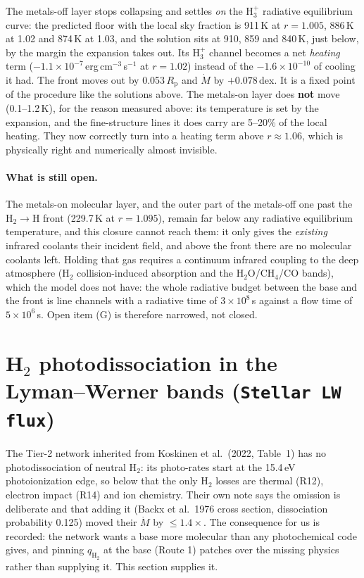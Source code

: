 \documentclass[english,a4paper]{my_memo}
\newcommand{\Rp}{R_{\mathrm{p}}}
\newcommand{\Mdot}{\dot{M}}
\newcommand{\qHH}{q_{\mathrm{H_2}}}
\begin{document}
\noindent The metals-off layer stops collapsing and settles \emph{on} the
H$_3^+$ radiative equilibrium curve: the predicted floor with the local sky
fraction is 911\,K at $r=1.005$, 886\,K at 1.02 and 874\,K at 1.03, and the
solution sits at 910, 859 and 840\,K, just below, by the margin the expansion
takes out. Its H$_3^+$ channel becomes a net \emph{heating} term
($-1.1\times10^{-7}$\,erg\,cm$^{-3}$\,s$^{-1}$ at $r=1.02$) instead of the
$-1.6\times10^{-10}$ of cooling it had. The front moves out by 0.053\,$\Rp$ and
$\Mdot$ by $+0.078$\,dex. It is a fixed point of the procedure like the solutions
above. The metals-on layer does \textbf{not} move (0.1--1.2\,K), for the reason
measured above: its temperature is set by the expansion, and the fine-structure
lines it does carry are 5--20\% of the local heating. They now correctly turn into
a heating term above $r\approx1.06$, which is physically right and numerically
almost invisible.

\paragraph{What is still open.} The metals-on molecular layer, and the outer part
of the metals-off one past the H$_2\to$H front (229.7\,K at $r=1.095$), remain far
below any radiative equilibrium temperature, and this closure cannot reach them:
it only gives the \emph{existing} infrared coolants their incident field, and
above the front there are no molecular coolants left. Holding that gas requires a
continuum infrared coupling to the deep atmosphere (H$_2$ collision-induced
absorption and the H$_2$O/CH$_4$/CO bands), which the model does not have: the
whole radiative budget between the base and the front is line channels with a
radiative time of $3\times10^{8}$\,s against a flow time of $5\times10^{6}$\,s.
Open item (G) is therefore narrowed, not closed.

\section{H$_2$ photodissociation in the Lyman--Werner bands
(\texttt{Stellar LW flux})}\label{sec:lw}

The Tier-2 network inherited from Koskinen et al.\ (2022, Table~1) has no
photodissociation of neutral H$_2$: its photo-rates start at the 15.4\,eV
photoionization edge, so below that the only H$_2$ losses are thermal (R12),
electron impact (R14) and ion chemistry. Their own note says the omission is
deliberate and that adding it (Backx et al.\ 1976 cross section, dissociation
probability 0.125) moved their $\Mdot$ by $\le1.4\times$.
The consequence for us is recorded: the network wants a base more molecular than any photochemical code gives, and
pinning $\qHH$ at the base (Route 1) patches over the missing physics rather than
supplying it. This section supplies it.
\end{document}
